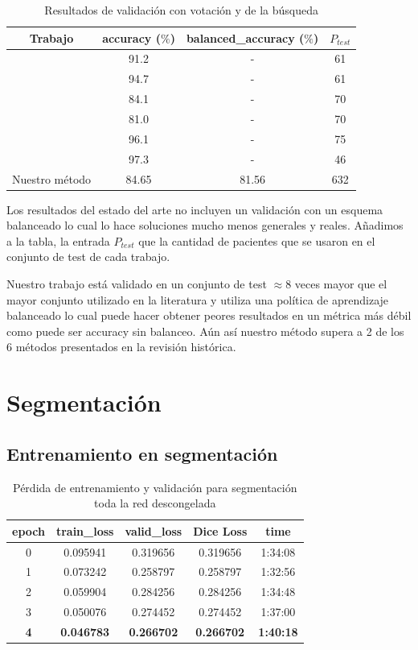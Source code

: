 \begin{table}[H]
	\centering
	\begin{tabular}{|cccc|}
		\toprule
		Trabajo & accuracy ($\%$) & balanced\_accuracy ($\%$) & $P_{test}$ \\
		\midrule
		\cite{cheng2015enhanced} & 91.2 & - & 61\\ 
		\cite{cheng2016retrieval} & 94.7 & - & 61\\ 
		\cite{abiwinanda2019brain} & 84.1 & - & 70\\ 
		\cite{pashaei2018brain} & 81.0 & - & 70\\ 
		\cite{sultan2019multi} & 96.1 & - & 75\\
		\cite{diaz2021deep} & 97.3 & - & 46 \\  
		Nuestro método & 84.65 & 81.56 & 632 \\ 
		\bottomrule
	\end{tabular}
	\caption{Resultados de validación con votación y de la búsqueda}
	\label{tabla:resultados12}
\end{table}

Los resultados del estado del arte no incluyen un validación con un esquema balanceado lo cual lo hace soluciones mucho menos generales y reales. Añadimos a la tabla, la entrada $P_{test}$ que la cantidad de pacientes que se usaron en el conjunto de test de cada trabajo.

Nuestro trabajo está validado en un conjunto de test $\approx 8$ veces mayor que el mayor conjunto utilizado en la literatura y utiliza una política de aprendizaje balanceado lo cual puede hacer obtener peores resultados en un métrica más débil como puede ser accuracy sin balanceo. Aún así nuestro método supera a 2 de los 6 métodos presentados en la revisión histórica.

\section{Segmentación}

\subsection{Entrenamiento en segmentación}

\begin{table}[H]
	\centering
	\begin{tabular}{|ccccc|}
		\toprule
		epoch & train\_loss & valid\_loss & Dice Loss & time \\ 
		\midrule
		0 & 0.095941 & 0.319656 & 0.319656 & 1:34:08 \\ 
		1 & 0.073242 & 0.258797 & 0.258797 & 1:32:56 \\ 
		2 & 0.059904 & 0.284256 & 0.284256 & 1:34:48 \\ 
		3 & 0.050076 & 0.274452 & 0.274452 & 1:37:00 \\ 
		\textbf{4} & \textbf{0.046783} & \textbf{0.266702} & \textbf{0.266702} & \textbf{1:40:18} \\ 
		\bottomrule
	\end{tabular}
	\caption{Pérdida de entrenamiento y validación para segmentación toda la red descongelada}
	\label{tabla:resultados4}
\end{table}

